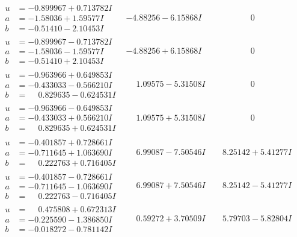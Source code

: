 \documentclass[1p]{elsarticle_modified}
\theoremstyle{definition}
\begin{document}
$$\begin{array}{c|c|c}
\begin{aligned}
u &= -0.899967 + 0.713782 I \\
a &= -1.58036 + 1.59577 I \\
b &= -0.51410 - 2.10453 I\end{aligned}
 & -4.88256 - 6.15868 I & \phantom{-0.000000 } 0 \\ \hline\begin{aligned}
u &= -0.899967 - 0.713782 I \\
a &= -1.58036 - 1.59577 I \\
b &= -0.51410 + 2.10453 I\end{aligned}
 & -4.88256 + 6.15868 I & \phantom{-0.000000 } 0 \\ \hline\begin{aligned}
u &= -0.963966 + 0.649853 I \\
a &= -0.433033 - 0.566210 I \\
b &= \phantom{-}0.829635 - 0.624531 I\end{aligned}
 & \phantom{-}1.09575 - 5.31508 I & \phantom{-0.000000 } 0 \\ \hline\begin{aligned}
u &= -0.963966 - 0.649853 I \\
a &= -0.433033 + 0.566210 I \\
b &= \phantom{-}0.829635 + 0.624531 I\end{aligned}
 & \phantom{-}1.09575 + 5.31508 I & \phantom{-0.000000 } 0 \\ \hline\begin{aligned}
u &= -0.401857 + 0.728661 I \\
a &= -0.711645 + 1.063690 I \\
b &= \phantom{-}0.222763 + 0.716405 I\end{aligned}
 & \phantom{-}6.99087 - 7.50546 I & \phantom{-}8.25142 + 5.41277 I \\ \hline\begin{aligned}
u &= -0.401857 - 0.728661 I \\
a &= -0.711645 - 1.063690 I \\
b &= \phantom{-}0.222763 - 0.716405 I\end{aligned}
 & \phantom{-}6.99087 + 7.50546 I & \phantom{-}8.25142 - 5.41277 I \\ \hline\begin{aligned}
u &= \phantom{-}0.475808 + 0.672313 I \\
a &= -0.225590 - 1.386850 I \\
b &= -0.018272 - 0.781142 I\end{aligned}
 & \phantom{-}0.59272 + 3.70509 I & \phantom{-}5.79703 - 5.82804 I \\ \hline\begin{aligned}

\end{aligned}
\end{array}$$
\end{document}

